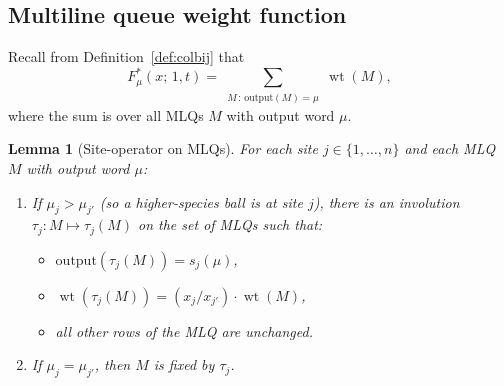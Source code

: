 \documentclass[12pt]{article}
\newtheorem{lemma}[theorem]{Lemma}
\theoremstyle{definition}
\DeclareMathOperator{\wt}{wt}
\begin{document}
\subsection{Multiline queue weight function}

Recall from Definition~\ref{def:colbij} that
\[
  F^*_\mu(x;\,1,t) = \sum_{\substack{M \,:\, \text{output}(M) = \mu}} \wt(M),
\]
where the sum is over all MLQs $M$ with output word $\mu$.

\begin{lemma}[Site-operator on MLQs]\label{lem:siteop}
For each site $j \in \{1,\dots,n\}$ and each MLQ $M$ with output word $\mu$:
\begin{enumerate}[label=(\alph*)]
\item\label{item:push} If $\mu_j > \mu_{j'}$ (so a higher-species ball is at
  site $j$), there is an \emph{involution} $\tau_j : M \mapsto \tau_j(M)$ on the
  set of MLQs such that:
  \begin{itemize}
  \item $\text{output}(\tau_j(M)) = s_j(\mu)$,
  \item $\wt(\tau_j(M)) = (x_j / x_{j'}) \cdot \wt(M)$,
  \item all other rows of the MLQ are unchanged.
  \end{itemize}
\item\label{item:equal} If $\mu_j = \mu_{j'}$, then $M$ is fixed by $\tau_j$.
\end{enumerate}
\end{lemma}
\end{document}
